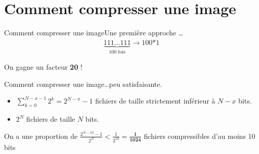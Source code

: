 \section{Comment compresser une image}

\begin{frame}{Comment compresser une image}{Une première approche \dots}
    \begin{align*}
        \underbrace{111\dots111}_{\text{100 fois}} \longrightarrow \textrm{100*1} 
    \end{align*} 

    \begin{center}
        On gagne un facteur \textbf{20} !
    \end{center}
\end{frame}

\begin{frame}{Comment compresser une image}{\dots peu satisfaisante.}
    \begin{itemize}
        \item \(\displaystyle\sum_{k=0}^{N-x-1}2^k = 2^{N - x} - 1\) fichiers de taille strictement inférieur à \(N-x\) bits.
        \item \(2^N\) fichiers de taille $N$ bits.
    \end{itemize}
    On a une proportion de \(\frac{2^{N-10} - 1}{2^N} < \frac{1}{2^{10}} = \mathbf{\frac{1}{1024}}\) fichiers compressibles d'au moins 10 bits
\end{frame}

%

